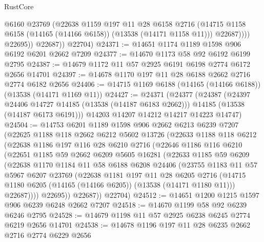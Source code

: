 \begin{lexlean}{RustCore}
\begin{coremodule}
                    @6160
                    @23769
                    (@22638
                      @1159
                      @197
                      @11
                      @28
                      @6158
                      @2716
                      (@14715 @1158 @6158 (@14165 (@14166 @6158)) (@13538 (@14171 @1158 @11)))
                      @22687))))
              @22695))
          @22687))
      @22704)
@24371 := @14651 @1174 @1189 @1598 @906 @6192 @6201 @2662 @7209
@24377 := @14670 @1173 @58 @92 @6192 @6199 @2795
@24387 := @14679 @1172 @11 @57 @2925 @6191 @6198 @2774 @6172 @2656 @14701
@24397 := @14678 @1170 @197 @11 @28 @6188 @2662 @2716 @2774 @6182 @2656
@24406 := @14715 @1169 @6188 (@14165 (@14166 @6188)) (@13538 (@14171 @1169 @11))
@24427 := @24371
    (@24377
      (@24387
        (@24397 @24406 @14727 @14185 (@13538 (@14187 @6183 @2662)))
        @14185
        (@13538 (@14187 @6173 @6191)))
      @14203
      @14207
      @14212
      @14217
      @14223
      @14747)
@24504 := @14753
    @6201
    @1189
    @1598
    @906
    @2662
    @6213
    @6239
    @7207
    (@22625
      @1188
      @118
      @2662
      @6212
      @5602
      @13726
      (@22633
        @1188
        @118
        @6212
        (@22638
          @1186
          @197
          @116
          @28
          @6210
          @2716
          (@22646
            @1186
            @116
            @6210
            (@22651
              @1185
              @59
              @2662
              @6209
              @5605
              @16281
              (@22633
                @1185
                @59
                @6209
                (@22638
                  @1170
                  @1184
                  @11
                  @58
                  @6188
                  @6208
                  @24406
                  (@23755
                    @1183
                    @11
                    @57
                    @5967
                    @6207
                    @23769
                    (@22638
                      @1181
                      @197
                      @11
                      @28
                      @6205
                      @2716
                      (@14715 @1180 @6205 (@14165 (@14166 @6205)) (@13538 (@14171 @1180 @11)))
                      @22687))))
              @22695))
          @22687))
      @22704)
@24512 := @14651 @1200 @1215 @1597 @906 @6239 @6248 @2662 @7207
@24518 := @14670 @1199 @58 @92 @6239 @6246 @2795
@24528 := @14679 @1198 @11 @57 @2925 @6238 @6245 @2774 @6219 @2656 @14701
@24538 := @14678 @1196 @197 @11 @28 @6235 @2662 @2716 @2774 @6229 @2656

\end{coremodule}
\end{lexlean}
